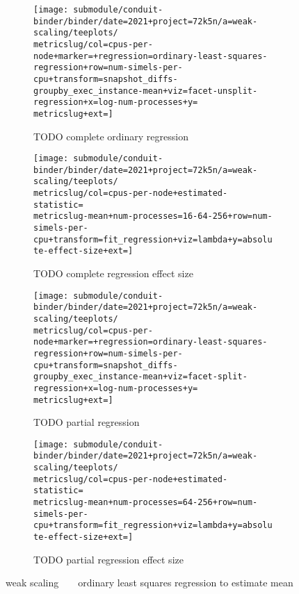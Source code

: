\begin{figure*}
  \centering

  \begin{subfigure}[b]{0.5\textwidth}
    \centering
    \texttt{[image: submodule/conduit-binder/binder/date=2021+project=72k5n/a=weak-scaling/teeplots/\\metricslug/col=cpus-per-node+marker=+regression=ordinary-least-squares-regression+row=num-simels-per-cpu+transform=snapshot\_diffs-groupby\_exec\_instance-mean+viz=facet-unsplit-regression+x=log-num-processes+y=\\metricslug+ext=]}
    \caption{TODO complete ordinary regression}
    \label{fig:weak-scaling-regression-ols-\metricslug-complete-regression}
  \end{subfigure}%
  \begin{subfigure}[b]{0.5\textwidth}
    \centering
    \texttt{[image: submodule/conduit-binder/binder/date=2021+project=72k5n/a=weak-scaling/teeplots/\\metricslug/col=cpus-per-node+estimated-statistic=\\metricslug-mean+num-processes=16-64-256+row=num-simels-per-cpu+transform=fit\_regression+viz=lambda+y=absolute-effect-size+ext=]}
    \caption{TODO complete regression effect size}
    \label{fig:weak-scaling-regression-ols-\metricslug-complete-effect-size}
  \end{subfigure}

  \begin{subfigure}[b]{0.5\textwidth}
    \centering
    \texttt{[image: submodule/conduit-binder/binder/date=2021+project=72k5n/a=weak-scaling/teeplots/\\metricslug/col=cpus-per-node+marker=+regression=ordinary-least-squares-regression+row=num-simels-per-cpu+transform=snapshot\_diffs-groupby\_exec\_instance-mean+viz=facet-split-regression+x=log-num-processes+y=\\metricslug+ext=]}
    \caption{TODO partial regression}
    \label{fig:weak-scaling-regression-ols-\metricslug-partial-regression}
  \end{subfigure}%
  \begin{subfigure}[b]{0.5\textwidth}
    \centering
    \texttt{[image: submodule/conduit-binder/binder/date=2021+project=72k5n/a=weak-scaling/teeplots/\\metricslug/col=cpus-per-node+estimated-statistic=\\metricslug-mean+num-processes=64-256+row=num-simels-per-cpu+transform=fit\_regression+viz=lambda+y=absolute-effect-size+ext=]}
    \caption{TODO partial regression effect size}
    \label{fig:weak-scaling-regression-ols-\metricslug-partial-effect-size}
  \end{subfigure}
  \caption{weak scaling ~ \metric ~ ordinary least squares regression to estimate mean}
  \label{fig:weak-scaling-regression-ols-\metricslug}
\end{figure*}
